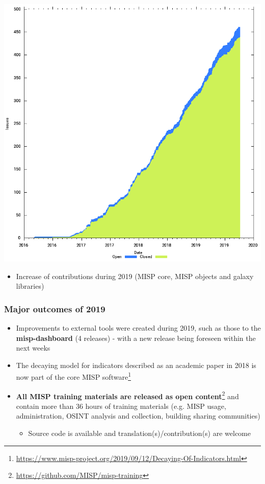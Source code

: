 \begin{frame}
        \includegraphics[scale=0.18]{galaxy-cfd.png}
\begin{itemize}
        \item Increase of contributions during 2019 (MISP core, MISP objects and galaxy libraries)
\end{itemize}

\end{frame}

\begin{frame}
        \frametitle{Major outcomes of 2019}
        \begin{itemize}
                \item Improvements to external tools were created during 2019, such as those to the {\bf misp-dashboard} (4 releases) - with a new release being foreseen within the next weeks
                \item The decaying model for indicators described as an academic paper in 2018 is now part of the core MISP software\footnote{\url{https://www.misp-project.org/2019/09/12/Decaying-Of-Indicators.html}}
                \item {\bf All MISP training materials are released as open content}\footnote{\url{https://github.com/MISP/misp-training}} and contain more than 36 hours of training materials (e.g. MISP usage, administration, OSINT analysis and collection,  building sharing communities)
                        \begin{itemize}
                                \item Source code is available and translation(s)/contribution(s) are welcome
                        \end{itemize}
        \end{itemize}
\end{frame}

